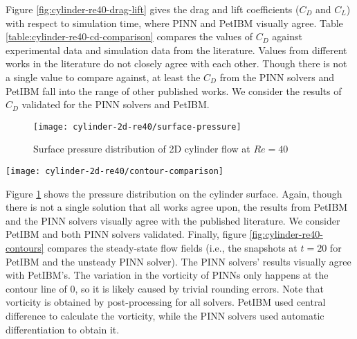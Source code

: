 Figure \ref{fig:cylinder-re40-drag-lift} gives the drag and lift coefficients ($C_D$ and $C_L$) with respect to simulation time, where PINN and PetIBM visually agree.
Table \ref{table:cylinder-re40-cd-comparison} compares the values of $C_D$ against experimental data and simulation data from the literature.
Values from different works in the literature do not closely agree with each other.
Though there is not a single value to compare against, at least the $C_D$ from the PINN solvers and PetIBM fall into the range of other published works.
We consider the results of $C_D$ validated for the PINN solvers and PetIBM.


\begin{figure}
    \centering%
    \texttt{[image: cylinder-2d-re40/surface-pressure]}%
    \caption{%
        Surface pressure distribution of 2D cylinder flow at $Re=\num{40}$
    }
    \label{fig:cylinder-re40-pinn-surfp}%
\end{figure}


\begin{figure*}
    \centering%
    \texttt{[image: cylinder-2d-re40/contour-comparison]}%
    \caption{%
        Contour plots for 2D cylinder flow at $Re=\num{40}$
    }
    \label{fig:cylinder-re40-contours}%
\end{figure*}

Figure \ref{fig:cylinder-re40-pinn-surfp} shows the pressure distribution on the cylinder surface.
Again, though there is not a single solution that all works agree upon, the results from PetIBM and the PINN solvers visually agree with the published literature.
We consider PetIBM and both PINN solvers validated.
Finally, figure \ref{fig:cylinder-re40-contours} compares the steady-state flow fields (i.e., the snapshots at $t=20$ for PetIBM and the unsteady PINN solver).
The PINN solvers' results visually agree with PetIBM's.
The variation in the vorticity of PINNs only happens at the contour line of \num{0}, so it is likely caused by trivial rounding errors.
Note that vorticity is obtained by post-processing for all solvers.
PetIBM used central difference to calculate the vorticity, while the PINN solvers used automatic differentiation to obtain it.


